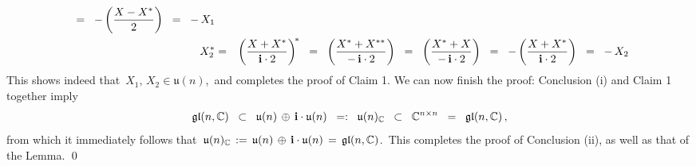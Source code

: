 \begin{enumerate}
\begin{eqnarray*}
    \;\; = \;\;
        -\left(\dfrac{X - X^{*}}{2}\right)
    \;\; = \;\;
        -\,X_{1}
    \\
    X_{2}^{*}
    & = &
        \left(\dfrac{X + X^{*}}{\mathbf{i} \cdot 2}\right)^{\!*}
    \;\; = \;\;
        \left(\dfrac{X^{*} + X^{**}}{-\,\mathbf{i} \cdot 2}\right)
    \;\; = \;\;
        \left(\dfrac{X^{*} + X}{-\,\mathbf{i} \cdot 2}\right)
    \;\; = \;\;
        -\left(\dfrac{X + X^{*}}{\mathbf{i} \cdot 2}\right)
    \;\; = \;\;
        -\,X_{2}
    \end{eqnarray*}
    This shows indeed that
    \,$X_{1},\, X_{2} \in \mathfrak{u}(n)$,\,
    and completes the proof of Claim 1.
    \vskip 0.5cm
    \noindent
    We can now finish the proof: Conclusion (i) and Claim 1 together imply
    \begin{equation*}
    \mathfrak{gl}(n,\mathbb{C})
    \;\;\subset\;\;
        \mathfrak{u}(n) \,\oplus\, \mathbf{i}\cdot\mathfrak{u}(n)
    \;\; =: \;\;
        \mathfrak{u}(n)_{\mathbb{C}}
    \;\;\subset\;\;
        \mathbb{C}^{n \times n}
    \;\; = \;\;
        \mathfrak{gl}(n,\mathbb{C})\,,
    \end{equation*}
    from which it immediately follows that
    \,$\mathfrak{u}(n)_{\mathbb{C}} \,:=\, \mathfrak{u}(n) \,\oplus\, \mathbf{i}\cdot\mathfrak{u}(n) \,=\, \mathfrak{gl}(n,\mathbb{C})$.\,
    This completes the proof of Conclusion (ii), as well as that of the Lemma.
    \qed
\end{enumerate}


